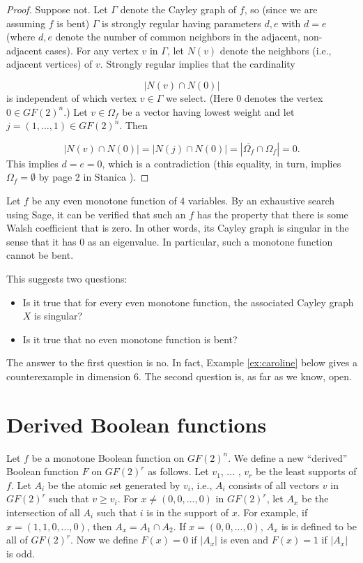 \documentclass[12pt]{article}
\begin{document}
\begin{proof}
Suppose not. Let $\Gamma$ denote the Cayley graph of $f$, so
(since we are assuming $f$ is bent) $\Gamma$ is strongly regular
having parameters $d,e$ with $d=e$ (where $d,e$ denote the number
of common neighbors in the adjacent, non-adjacent cases).
For any vertex $v$ in $\Gamma$, let $N(v)$ denote the neighbors
(i.e., adjacent vertices) of $v$. Strongly regular implies that the cardinality

\[
|N(v)\cap N(0)|
\]
is independent of which vertex $v \in \Gamma$ we select.
(Here $0$ denotes the vertex $0\in GF(2)^n$.)
Let $v\in \Omega_f$ be a vector having lowest weight
and let $j=(1,\dots,1)\in GF(2)^n$.
Then

\[
|N(v)\cap N(0)| = |N(j)\cap N(0)| = |\overline{\Omega_f}\cap \Omega_f|=0.
\]
This implies $d=e=0$, which is a contradiction (this equality, in turn, implies
$\Omega_f=\emptyset$ by page 2 in Stanica \cite{art:s07}).
\end{proof}

Let $f$ be any even monotone function of $4$ variables. By an
exhaustive search using Sage, it can be verified that such an $f$ has
the property that there is some Walsh coefficient that is zero.
In other words, its Cayley graph is singular in the sense that it
has $0$ as an eigenvalue. In particular, such a monotone function
cannot be bent.

This suggests two questions:
\begin{itemize}
\item
Is it true that for every even monotone function, the associated
Cayley graph $X$ is singular?
\item
Is it true that no even monotone function is bent?
\end{itemize}
The answer to the first question is no. In fact, Example \ref{ex:caroline}
below gives a counterexample in dimension $6$.
The second question is, as far as we know, open.


\section{Derived Boolean functions}

Let $f$ be a monotone Boolean function on $GF(2)^n$.    We define a new ``derived'' Boolean function $F$ on $GF(2)^r$ as follows.
Let $v_1$, ... , $v_r$ be the least supports of $f$.  Let $A_i$ be the atomic set generated by $v_i$, i.e., $A_i$ consists of all vectors $v$ in
$GF(2)^r$ such that $v \geq v_i$.  For $x \neq (0,0,...,0)$ in $GF(2)^r$, let $A_x$ be the intersection of all $A_i$ such that $i$ is in the support of $x$.
For example, if $x=(1,1,0,...,0)$, then $A_x=A_1 \cap A_2$.  If $x=(0,0,...,0)$, $A_x$ is is defined to be all of $GF(2)^r$.
Now we define $F(x)=0$ if $|A_x|$ is even and $F(x)=1$ if $|A_x|$ is odd.
\end{document}
